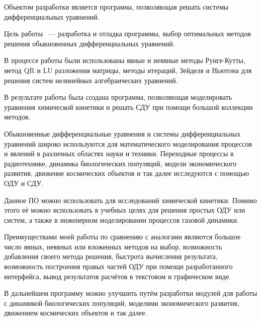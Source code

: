 
\abstract %


Объектом разработки является программа, позволяющая решать системы дифференциальных уравнений.

Цель работы ~--- разработка и отладка программы, выбор оптимальных методов решения обыкновенных дифференциальных уравнений.

В процессе работы были использованы явные и неявные методы Рунге-Кутты, метод QR и LU разложения матрицы, методы итераций, Зейделя и
Ньютона для решения систем нелинейных алгебраических уравнений.

В результате работы была создана программа, позволяющая моделировать уравнения химической кинетики и решать СДУ при помощи большой
коллекции методов.

Обыкновенные дифференциальные уравнения  и системы дифференциальных уравнений  широко используются для математического
моделирования процессов и явлений в различных областях науки и техники. Переходные процессы в радиотехнике, динамика биологических
популяций, модели экономического развития, движение космических объектов и так далее исследуются с помощью ОДУ и СДУ.

Данное ПО можно использовать для исследований химической кинетики. Помимо этого её можно использовать в учебных целях для решения
простых ОДУ или систем, а также в инженерном моделировании процессов газовой динамики.

Преимуществами моей работы по сравнению с аналогами являются большое число явных, неявных или вложенных методов на выбор, возможность
добавления своего метода
решения, быстрота вычисления результата, возможность построения правых частей ОДУ при помощи разработанного интерфейса, вывод
результатов расчётов в текстовом и графическом виде.

В дальнейшем программу можно улучшить путём разработки модулей для работы с динамикой биологических популяций, моделями экономического
развития, движением космических объектов и так далее.